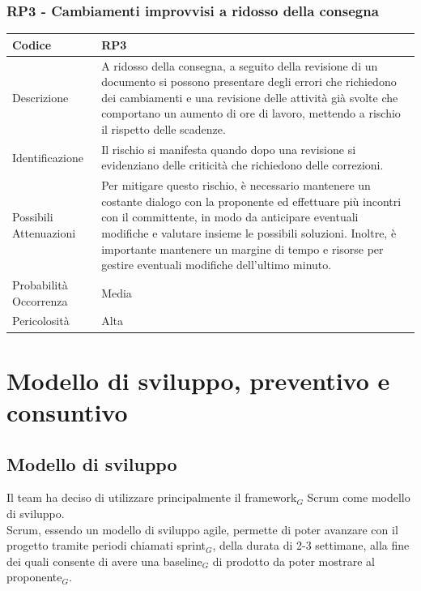 \documentclass[10pt]{article}
\begin{document}
{    \subsubsection{RP3 - Cambiamenti improvvisi a ridosso della consegna}
    \label{RP3}
    \begin{tabularx}{\textwidth}{|l|X|}
    \hline
    Codice & RP3 \\
    \hline
    Descrizione &  A ridosso della consegna, a seguito della revisione di un documento si possono presentare degli errori che richiedono dei cambiamenti e una revisione delle attività già svolte che comportano un aumento di ore di lavoro, mettendo a rischio il rispetto delle scadenze. \\
    \hline
    Identificazione &  Il rischio si manifesta quando dopo una revisione si evidenziano delle criticità che richiedono delle correzioni. \\
    \hline
    Possibili Attenuazioni &  Per mitigare questo rischio, è necessario mantenere un costante dialogo con la proponente ed effettuare più incontri con il committente, in modo da anticipare eventuali modifiche e valutare insieme le possibili soluzioni. Inoltre, è importante mantenere un margine di tempo e risorse per gestire eventuali modifiche dell'ultimo minuto. \\
    \hline
    Probabilità Occorrenza &  Media \\
    \hline
    Pericolosità & Alta \\
    \hline
    \end{tabularx}


\newpage
\section{Modello di sviluppo, preventivo e consuntivo} 
\label{modello-sviluppo}
\subsection{Modello di sviluppo}
Il team ha deciso di utilizzare principalmente il framework$_G$ Scrum come modello di sviluppo.\\
Scrum, essendo un modello di sviluppo agile, permette di poter avanzare con il progetto tramite periodi chiamati sprint$_G$, della durata di 2-3 settimane, alla fine dei quali consente di avere una baseline$_G$ di prodotto da poter mostrare al proponente$_G$.
}
\end{document}
